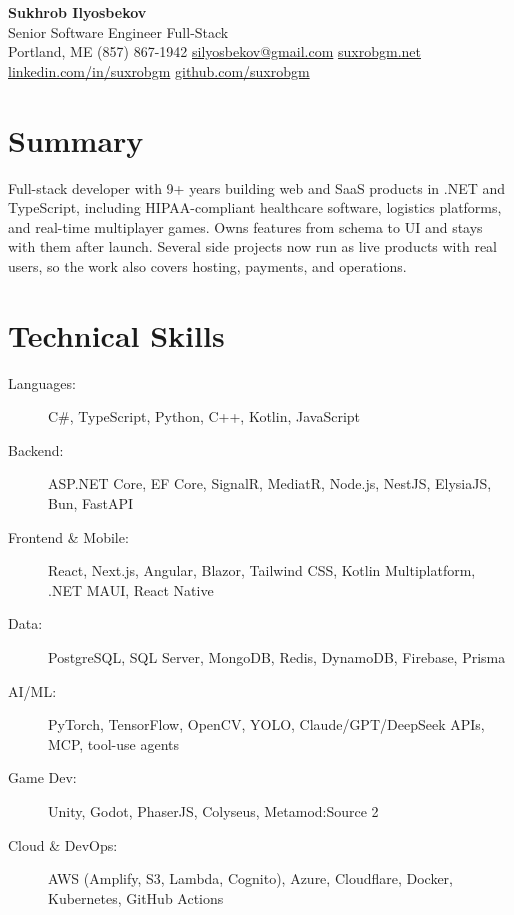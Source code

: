 \documentclass[letterpaper,11pt]{article}
\begin{document}
\begin{center}
    {\Huge\bfseries\color{darktext} Sukhrob Ilyosbekov}\vspace{4pt}\\
    {\large\color{accent} Senior Software Engineer \enspace\textperiodcentered\enspace Full-Stack}\vspace{8pt}\\
    {\color{lighttext}
    \faMapMarker*\enspace Portland, ME \quad
    \faPhone\enspace(857) 867-1942 \quad
    \faEnvelope\enspace\href{mailto:silyosbekov@gmail.com}{silyosbekov@gmail.com} \quad
    \faGlobe\enspace\href{https://suxrobgm.net}{suxrobgm.net} \quad
    \faLinkedin\enspace\href{https://www.linkedin.com/in/suxrobgm}{linkedin.com/in/suxrobgm} \quad
    \faGithub\enspace\href{https://github.com/suxrobgm}{github.com/suxrobgm}
    }
\end{center}

\section{Summary}
Full-stack developer with 9+ years building web and SaaS products in .NET and TypeScript, including HIPAA-compliant healthcare software, logistics platforms, and real-time multiplayer games. Owns features from schema to UI and stays with them after launch. Several side projects now run as live products with real users, so the work also covers hosting, payments, and operations.

\section{Technical Skills}
\begin{description}
    \item[Languages:] C\#, TypeScript, Python, C++, Kotlin, JavaScript
    \item[Backend:] ASP.NET Core, EF Core, SignalR, MediatR, Node.js, NestJS, ElysiaJS, Bun, FastAPI
    \item[Frontend \& Mobile:] React, Next.js, Angular, Blazor, Tailwind CSS, Kotlin Multiplatform, .NET MAUI, React Native
    \item[Data:] PostgreSQL, SQL Server, MongoDB, Redis, DynamoDB, Firebase, Prisma
    \item[AI/ML:] PyTorch, TensorFlow, OpenCV, YOLO, Claude/GPT/DeepSeek APIs, MCP, tool-use agents
    \item[Game Dev:] Unity, Godot, PhaserJS, Colyseus, Metamod:Source 2
    \item[Cloud \& DevOps:] AWS (Amplify, S3, Lambda, Cognito), Azure, Cloudflare, Docker, Kubernetes, GitHub Actions
\end{description}
\end{document}

